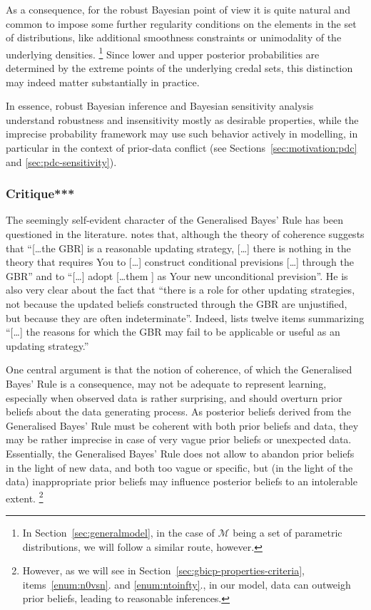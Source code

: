 As a consequence, for the robust Bayesian point of view it is quite natural and common
to impose some further regularity conditions on the elements in the set of distributions,
like additional smoothness constraints or unimodality of the underlying densities.%
\footnote{In Section~\ref{sec:generalmodel}, in the case of $\mathcal{M}$ being a set of parametric distributions,
we will follow a similar route, however.}
Since lower and upper posterior probabilities are determined by the extreme points of the underlying credal sets,
this distinction may indeed matter substantially in practice.

In essence, robust Bayesian inference and Bayesian sensitivity analysis
understand robustness and insensitivity mostly as desirable properties,
while the imprecise probability framework may use such behavior actively in modelling,
in particular in the context of prior-data conflict
(see Sections~\ref{sec:motivation:pdc} and \ref{sec:pdc-sensitivity}).

\subsubsection{Critique***}
\label{sec:updating}


The seemingly self-evident character of the Generalised Bayes' Rule has been questioned in the literature.
\Textcite[p.~335]{1991:walley} notes that, although the theory of coherence suggests that
``[\ldots the GBR] is a reasonable updating strategy,
[\ldots] there is nothing in the theory that requires You to [\ldots] construct conditional previsions [\ldots] through the GBR''
and to ``[\ldots] adopt [\ldots them ] as Your new unconditional prevision''.
He is also very clear about the fact \parencite[see][p.~334]{1991:walley} that
``there is a role for other updating strategies, not because the updated beliefs constructed through the GBR are unjustified,
but because they are often indeterminate''.
Indeed, \textcite[\S 6.11.1]{1991:walley} lists twelve items summarizing
``[\ldots] the reasons for which the GBR may fail to be applicable or useful as an updating strategy.''

One central argument is that the notion of coherence, of which the Generalised Bayes' Rule is a consequence,
may not be adequate to represent learning, especially when observed data is rather surprising,
and should overturn prior beliefs about the data generating process.
As posterior beliefs derived from the Generalised Bayes' Rule must be coherent with both prior beliefs and data,
they may be rather imprecise in case of very vague prior beliefs or unexpected data.
Essentially, the Generalised Bayes' Rule does not allow to abandon prior beliefs in the light of new data,
and both too vague or specific, but (in the light of the data) inappropriate prior beliefs
may influence posterior beliefs to an intolerable extent.%
\footnote{However, as we will see in Section~\ref{sec:gbicp-properties-criteria},
items~\ref{enum:n0vsn}. and \ref{enum:ntoinfty}.,
in our model, data can outweigh prior beliefs,
leading to reasonable inferences.}

